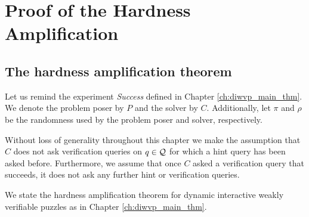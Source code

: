 %
\section{Proof of the Hardness Amplification}
\label{st:main_theorem}%
\subsection{The hardness amplification theorem}
\label{subst:main_theorem}%
Let us remind the experiment \textit{Success} defined in Chapter \ref{ch:diwvp_main_thm}.
We denote the problem poser by $P$ and the solver by $C$. Additionally, let $\pi$ and $\rho$ be the randomness used by
the problem poser and solver, respectively.

\success*

Without loss of generality throughout this chapter we make the assumption that $C$ does not ask verification queries on $q \in \mathcal{Q}$
for which a hint query has been asked before. Furthermore, we assume that once $C$ asked
a verification query that succeeds, it does not ask any further hint or verification queries.

We state the hardness amplification theorem for dynamic interactive weakly verifiable puzzles as in Chapter \ref{ch:diwvp_main_thm}.
\hardnessAmpfDiwvp*
%
